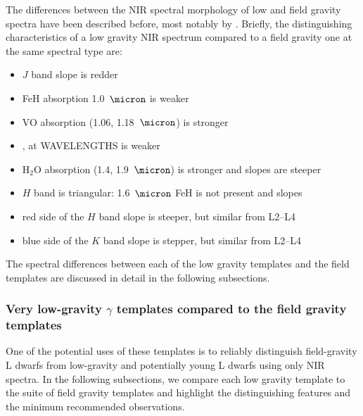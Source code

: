\documentclass[12pt,preprint]{aastex}
\begin{document}
The differences between the NIR spectral morphology of low and field gravity spectra have been described before, most notably by \citet{Allers:2013hk}. Briefly, the distinguishing characteristics of a low gravity NIR spectrum compared to a field gravity one at the same spectral type are:
\begin{itemize}
\item $J$ band slope is redder
\item FeH absorption 1.0~$\micron$ is weaker
\item VO absorption (1.06, 1.18~$\micron$) is stronger
\item {},  at WAVELENGTHS is weaker
\item H$_2$O absorption (1.4, 1.9~$\micron$) is stronger and slopes are steeper
\item $H$ band is triangular: 1.6~$\micron$ FeH is not present and slopes
\item red side of the $H$ band slope is steeper, but similar from L2--L4 
\item blue side of the $K$ band slope is stepper, but similar from L2--L4 
\end{itemize}
The spectral differences between each of the low gravity templates and the field templates are discussed in detail in the following subsections.

\subsubsection{Very low-gravity $\gamma$ templates compared to the field gravity templates}

One of the potential uses of these templates is to reliably distinguish field-gravity L dwarfs from low-gravity and potentially young L dwarfs using only NIR spectra. 
In the following subsections, we compare each low gravity template to the suite of field gravity templates and highlight the distinguishing features and the minimum recommended observations.
\end{document}

